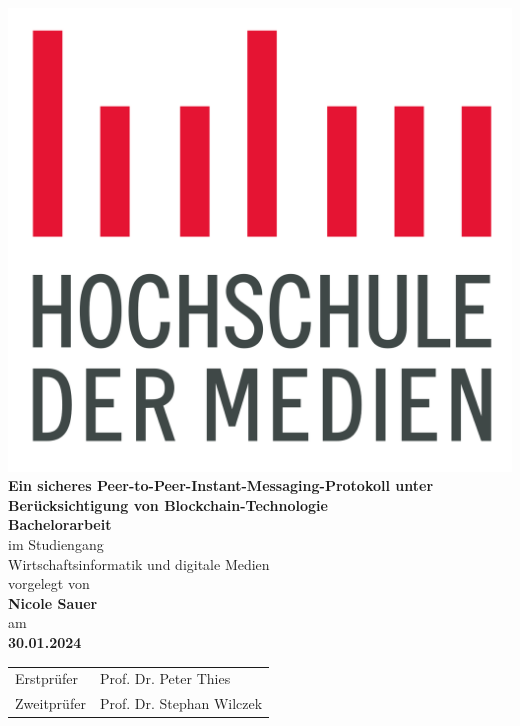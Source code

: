 \documentclass[12pt, a4paper]{report}
\begin{document}
    \begin{titlepage}
        \begin{center}
            \includegraphics[width=0.3\linewidth]{images/hdm_logo.png} \\
            \vspace*{2cm}
            \Huge
            \textbf{Ein sicheres Peer-to-Peer-Instant-Messaging-Protokoll unter
            Berücksichtigung von Blockchain-Technologie}\\

            \vspace*{1cm}
            \Large 
            \textbf{Bachelorarbeit}\\
            \bigbreak
            im Studiengang \\
            Wirtschaftsinformatik und digitale Medien\\
            \vspace*{1cm}
            \large 
            vorgelegt von \\
            \vspace*{0.5cm}
            \textbf{Nicole Sauer} \\
            \vspace*{0.2cm}
            am \\
            \vspace*{0.2cm}
            \textbf{30.01.2024} \\
            \vspace*{1.3cm}
            \large 
            \begin{tabular}{ll}
                Erstprüfer & Prof. Dr. Peter Thies \\
                Zweitprüfer & Prof. Dr. Stephan Wilczek \\
            \end{tabular} \\
        \end{center}
    \end{titlepage}
    
    \onehalfspacing

    \tableofcontents
    
    
    



    \printbibliography[type=online,title={Webseiten}]
    \printbibliography[nottype=online, title={Bücher und Dokumente}]
\end{document}
